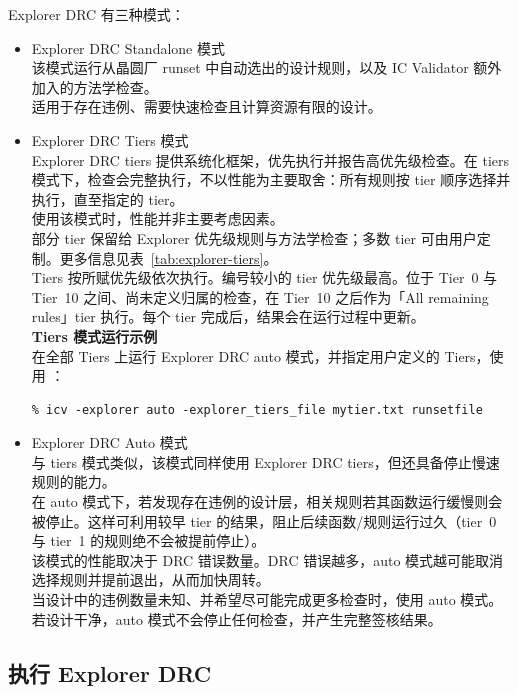 Explorer DRC 有三种模式：
\begin{itemize}
  \item Explorer DRC Standalone 模式\\
  该模式运行从晶圆厂 runset 中自动选出的设计规则，以及 IC Validator 额外加入的方法学检查。\\
  适用于存在违例、需要快速检查且计算资源有限的设计。

  \item Explorer DRC Tiers 模式\\
  Explorer DRC tiers 提供系统化框架，优先执行并报告高优先级检查。在 tiers 模式下，检查会完整执行，不以性能为主要取舍：所有规则按 tier 顺序选择并执行，直至指定的 tier。\\
  使用该模式时，性能并非主要考虑因素。\\
  部分 tier 保留给 Explorer 优先级规则与方法学检查；多数 tier 可由用户定制。更多信息见表~\ref{tab:explorer-tiers}。\\
  Tiers 按所赋优先级依次执行。编号较小的 tier 优先级最高。位于 Tier~0 与 Tier~10 之间、尚未定义归属的检查，在 Tier~10 之后作为「All remaining rules」tier 执行。每个 tier 完成后，结果会在运行过程中更新。\\
  \textbf{Tiers 模式运行示例}\\
  在全部 Tiers 上运行 Explorer DRC auto 模式，并指定用户定义的 Tiers，使用 ：
\begin{lstlisting}
% icv -explorer auto -explorer_tiers_file mytier.txt runsetfile
\end{lstlisting}

  \item Explorer DRC Auto 模式\\
  与 tiers 模式类似，该模式同样使用 Explorer DRC tiers，但还具备停止慢速规则的能力。\\
  在 auto 模式下，若发现存在违例的设计层，相关规则若其函数运行缓慢则会被停止。这样可利用较早 tier 的结果，阻止后续函数/规则运行过久（tier~0 与 tier~1 的规则绝不会被提前停止）。\\
  该模式的性能取决于 DRC 错误数量。DRC 错误越多，auto 模式越可能取消选择规则并提前退出，从而加快周转。\\
  当设计中的违例数量未知、并希望尽可能完成更多检查时，使用 auto 模式。若设计干净，auto 模式不会停止任何检查，并产生完整签核结果。
\end{itemize}

\subsection{执行 Explorer DRC}
